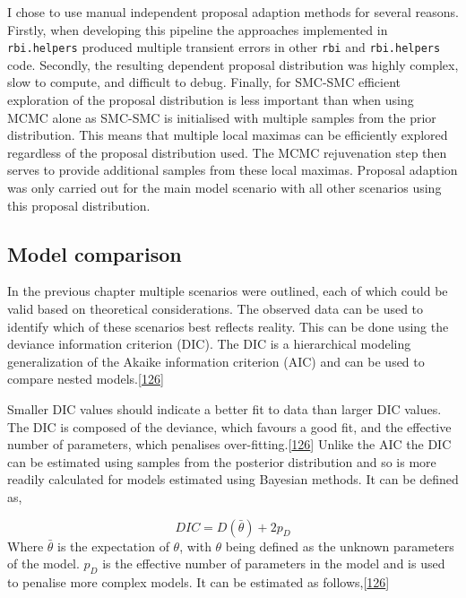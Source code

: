 \documentclass[11pt,twoside]{bristolthesis}
\begin{document}
  I chose to use manual independent proposal adaption methods for several reasons. Firstly, when developing this pipeline the approaches implemented in \texttt{rbi.helpers} produced multiple transient errors in other \texttt{rbi} and \texttt{rbi.helpers} code. Secondly, the resulting dependent proposal distribution was highly complex, slow to compute, and difficult to debug. Finally, for SMC-SMC efficient exploration of the proposal distribution is less important than when using MCMC alone as SMC-SMC is initialised with multiple samples from the prior distribution. This means that multiple local maximas can be efficiently explored regardless of the proposal distribution used. The MCMC rejuvenation step then serves to provide additional samples from these local maximas. Proposal adaption was only carried out for the main model scenario with all other scenarios using this proposal distribution.
  
  \hypertarget{model-comparison}{%
  \subsection{Model comparison}\label{model-comparison}}
  
  In the previous chapter multiple scenarios were outlined, each of which could be valid based on theoretical considerations. The observed data can be used to identify which of these scenarios best reflects reality. This can be done using the deviance information criterion (DIC). The DIC is a hierarchical modeling generalization of the Akaike information criterion (AIC) and can be used to compare nested models.{[}\protect\hyperlink{ref-Gelman:nll_LBlw}{126}{]}
  
  Smaller DIC values should indicate a better fit to data than larger DIC values. The DIC is composed of the deviance, which favours a good fit, and the effective number of parameters, which penalises over-fitting.{[}\protect\hyperlink{ref-Gelman:nll_LBlw}{126}{]} Unlike the AIC the DIC can be estimated using samples from the posterior distribution and so is more readily calculated for models estimated using Bayesian methods. It can be defined as,
  
  \[ {\mathit  {DIC}}=D({\bar  {\theta }})+2p_{D}\]
  Where \(\bar{\theta}\) is the expectation of \(\theta\), with \(\theta\) being defined as the unknown parameters of the model. \(p_{D}\) is the effective number of parameters in the model and is used to penalise more complex models. It can be estimated as follows,{[}\protect\hyperlink{ref-Gelman:nll_LBlw}{126}{]}
  
\end{document}
